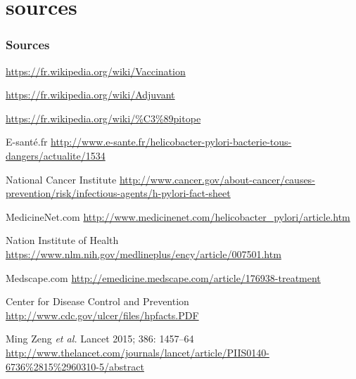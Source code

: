\documentclass{PresentationHEIGVD}
\begin{document}
\section*{sources}


\begin{frame}[allowframebreaks]
  \frametitle<presentation>{Sources}    
  \begin{thebibliography}{10}  
    \beamertemplateonlinebibitems
    \newblock \url{https://fr.wikipedia.org/wiki/Vaccination}
    
      \beamertemplateonlinebibitems
    \newblock \url{https://fr.wikipedia.org/wiki/Adjuvant}
    
          \beamertemplateonlinebibitems
    \newblock \url{https://fr.wikipedia.org/wiki/\%C3\%89pitope }
    
          \beamertemplateonlinebibitems
  E-santé.fr
    \newblock \url{http://www.e-sante.fr/helicobacter-pylori-bacterie-tous-dangers/actualite/1534 } 
   
 \beamertemplateonlinebibitems
  National Cancer Institute
    \newblock \url{http://www.cancer.gov/about-cancer/causes-prevention/risk/infectious-agents/h-pylori-fact-sheet}   
    
 \beamertemplateonlinebibitems
  MedicineNet.com
    \newblock \url{http://www.medicinenet.com/helicobacter_pylori/article.htm}      

 \beamertemplateonlinebibitems
  Nation Institute of Health
    \newblock \url{https://www.nlm.nih.gov/medlineplus/ency/article/007501.htm}   
    
   \beamertemplateonlinebibitems
  Medscape.com
    \newblock \url{http://emedicine.medscape.com/article/176938-treatment}       
        
   \beamertemplatearticlebibitems
  Center for Disease Control and Prevention
    \newblock \url{http://www.cdc.gov/ulcer/files/hpfacts.PDF}
    
       \beamertemplatearticlebibitems
  Ming Zeng {\em et al.}
    \newblock Lancet 2015; 386: 1457–64
    \newblock \url{http://www.thelancet.com/journals/lancet/article/PIIS0140-6736\%2815\%2960310-5/abstract}   
    

\end{thebibliography}
\end{frame}
\end{document}
